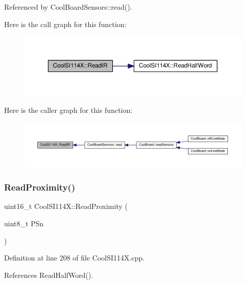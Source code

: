 Referenced by Cool\+Board\+Sensors\+::read().

Here is the call graph for this function\+:\nopagebreak
\begin{figure}[H]
\begin{center}
\leavevmode
\includegraphics[width=350pt]{dd/d67/class_cool_s_i114_x_abc536ee7ae8e3ba9d1069acc3889a2cf_cgraph}
\end{center}
\end{figure}
Here is the caller graph for this function\+:\nopagebreak
\begin{figure}[H]
\begin{center}
\leavevmode
\includegraphics[width=350pt]{dd/d67/class_cool_s_i114_x_abc536ee7ae8e3ba9d1069acc3889a2cf_icgraph}
\end{center}
\end{figure}
\mbox{\label{class_cool_s_i114_x_a194fede1105508c7803dbb567cbdcc67}} 
\subsubsection{\texorpdfstring{Read\+Proximity()}{ReadProximity()}}
{\footnotesize\ttfamily uint16\+\_\+t Cool\+S\+I114\+X\+::\+Read\+Proximity (\begin{DoxyParamCaption}\item[{uint8\+\_\+t}]{P\+Sn }\end{DoxyParamCaption})}



Definition at line 208 of file Cool\+S\+I114\+X.\+cpp.



References Read\+Half\+Word().

